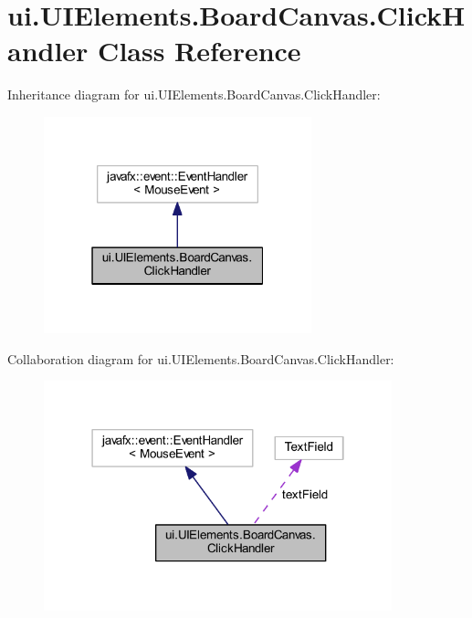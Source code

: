 \hypertarget{classui_1_1_u_i_elements_1_1_board_canvas_1_1_click_handler}{}\section{ui.\+U\+I\+Elements.\+Board\+Canvas.\+Click\+Handler Class Reference}
\label{classui_1_1_u_i_elements_1_1_board_canvas_1_1_click_handler}


Inheritance diagram for ui.\+U\+I\+Elements.\+Board\+Canvas.\+Click\+Handler\+:
\nopagebreak
\begin{figure}[H]
\begin{center}
\leavevmode
\includegraphics[width=220pt]{classui_1_1_u_i_elements_1_1_board_canvas_1_1_click_handler__inherit__graph}
\end{center}
\end{figure}


Collaboration diagram for ui.\+U\+I\+Elements.\+Board\+Canvas.\+Click\+Handler\+:
\nopagebreak
\begin{figure}[H]
\begin{center}
\leavevmode
\includegraphics[width=286pt]{classui_1_1_u_i_elements_1_1_board_canvas_1_1_click_handler__coll__graph}
\end{center}
\end{figure}
